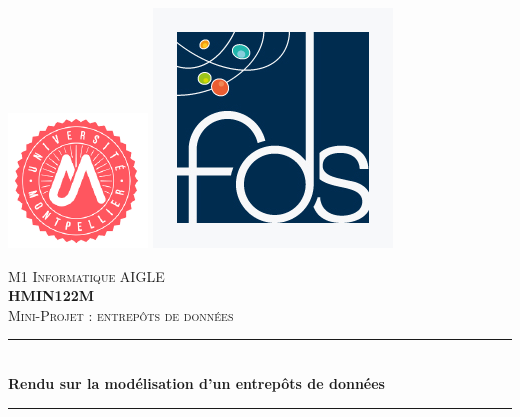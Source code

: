\documentclass[a4paper,12pt]{report}
\begin{document}
\begin{titlepage}
\newcommand{\HRule}{\rule{\linewidth}{0.5mm}} %
\center

\includegraphics[scale=0.5]{images/umLogo.png} %
\hspace{\fill}
\includegraphics[scale=0.25]{images/fdsLogo.jpg} %

\textsc{\LARGE M1 Informatique AIGLE}\\[1cm]
\textsc{\Large \textbf{HMIN122M}}\\[0.25cm]
\textsc{\large Mini-Projet : entrepôts de données}\\[0.8cm]

\HRule \\[0.4cm]
{ \huge \bfseries Rendu sur la modélisation d'un entrepôts de données}\\[0.4cm]
\HRule \\[0.8cm]


\end{titlepage}
\end{document}
